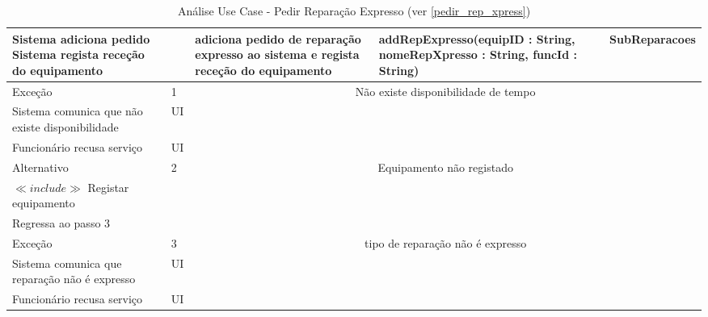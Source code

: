 \documentclass[../relatorio.tex]{subfiles}
\begin{document}
\begin{landscape}
\begin{table}[!h]
\begin{tabular}{|p{5cm}|p{1cm}|p{4cm}|p{6cm}|p{3cm}|}
            \\
            \hline
            Sistema adiciona pedido
            Sistema regista receção do equipamento
                     & 
                     & adiciona pedido de reparação expresso ao sistema e regista receção do equipamento
                     & addRepExpresso(equipID : String, nomeRepXpresso : String, funcId : String)
                     & SubReparacoes
            \\
            \hline
            \rowcolor{red!30}
            Exceção  & 1                                               &  \multicolumn{3}{c}{Não existe disponibilidade de tempo}\\
            \hline
            \rowcolor{yellow}
            Sistema comunica que não existe disponibilidade
                     & UI
                     & 
                     & 
                     & 
            \\
            \hline
            Funcionário recusa serviço
                     & UI
                     & 
                     & 
                     & 
            \\
            \hline
            \rowcolor{green!30}
            Alternativo  & 2                                               &  \multicolumn{3}{c}{Equipamento não registado}\\
            \hline
            $\ll include \gg$ Registar equipamento
                     & 
                     & 
                     & 
                     & 
            \\
            \hline
            Regressa ao passo 3
                     & 
                     & 
                     & 
                     & 
            \\
            \hline
            \rowcolor{red!30}
            Exceção  & 3                                               &  \multicolumn{3}{c}{tipo de reparação não é expresso}\\
            \hline
            \rowcolor{yellow}
            Sistema comunica que reparação não é expresso
                     & UI
                     & 
                     & 
                     & 
            \\
            \hline
            Funcionário recusa serviço
                     & UI
                     & 
                     & 
                     & 
            \\
            \hline
        \end{tabular}
        \caption{Análise Use Case - Pedir Reparação Expresso (ver \ref{pedir_rep_xpress})}
    \end{table}
\end{landscape}
\end{document}
